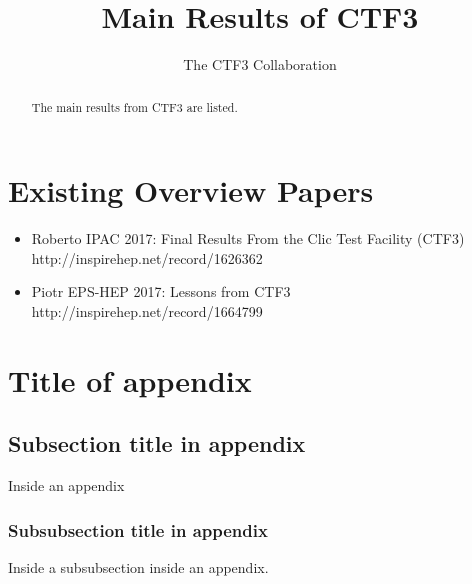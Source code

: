 \documentclass[biblatex]{cernrep}
\begin{document}
\title{Main Results of CTF3}

\author{The CTF3 Collaboration}


\begin{abstract}
The main results from CTF3 are listed.
\end{abstract}


\maketitle




\section{Existing Overview Papers}

\begin{itemize}
\item Roberto IPAC 2017: Final Results From the Clic Test Facility (CTF3)
http://inspirehep.net/record/1626362

\item Piotr EPS-HEP 2017: Lessons from CTF3
http://inspirehep.net/record/1664799
\end{itemize}



















\appendix
\section{Title of appendix}
\label{sec:app}

\subsection{Subsection title in appendix}
Inside an appendix
\subsubsection{Subsubsection title in appendix}
Inside a subsubsection inside an appendix.

\end{document}
